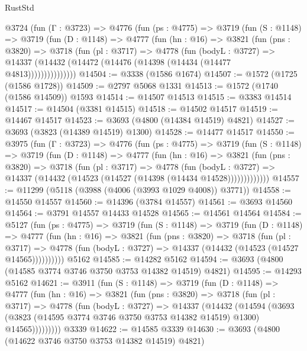 \begin{lexlean}{RustStd}
\begin{coremodule}
    @3724
      (fun (Γ : @3723) =>
      @4776
        (fun (ps : @4775) =>
        @3719
          (fun (S : @1148) =>
          @3719
            (fun (D : @1148) =>
            @4777
              (fun (hn : @16) =>
              @3821
                (fun (pns : @3820) =>
                @3718
                  (fun (pl : @3717) =>
                  @4778
                    (fun (bodyL : @3727) =>
                    @14337 (@14432 (@14472 (@14476 (@14398 (@14434 (@14477 @4813)))))))))))))))
@14504 := @3338 (@1586 @1674)
@14507 := @1572 (@1725 (@1586 @1728))
@14509 := @2797 @5068 @1331
@14513 := @1572 (@1740 (@1586 @14509)) @1593
@14514 := @14507 @14513
@14515 := @3383 @14514
@14517 := @14504 (@3381 @14515)
@14518 := @14502 @14517
@14519 := @14467 @14517
@14523 := @3693 (@4800 (@14384 @14519) @4821)
@14527 := @3693 (@3823 (@14389 @14519) @1300)
@14528 := @14477 @14517
@14550 := @3975
    (fun (Γ : @3723) =>
    @4776
      (fun (ps : @4775) =>
      @3719
        (fun (S : @1148) =>
        @3719
          (fun (D : @1148) =>
          @4777
            (fun (hn : @16) =>
            @3821
              (fun (pns : @3820) =>
              @3718
                (fun (pl : @3717) =>
                @4778
                  (fun (bodyL : @3727) =>
                  @14337 (@14432 (@14523 (@14527 (@14398 (@14434 @14528)))))))))))))
@14557 := @11299 (@5118 (@3988 (@4006 (@3993 @1029 @4008)) @3771))
@14558 := @14550 @14557
@14560 := @14396 (@3784 @14557)
@14561 := @3693 @14560
@14564 := @3791 @14557 @14433 @14528
@14565 := @14561 @14564
@14584 := @5127
    (fun (ps : @4775) =>
    @3719
      (fun (S : @1148) =>
      @3719
        (fun (D : @1148) =>
        @4777
          (fun (hn : @16) =>
          @3821
            (fun (pns : @3820) =>
            @3718
              (fun (pl : @3717) =>
              @4778 (fun (bodyL : @3727) => @14337 (@14432 (@14523 (@14527 @14565))))))))))
    @5162
@14585 := @14282 @5162
@14594 := @3693 (@4800 (@14585 @3774 @3746 @3750 @3753 @14382 @14519) @4821)
@14595 := @14293 @5162
@14621 := @3911
    (fun (S : @1148) =>
    @3719
      (fun (D : @1148) =>
      @4777
        (fun (hn : @16) =>
        @3821
          (fun (pns : @3820) =>
          @3718
            (fun (pl : @3717) =>
            @4778
              (fun (bodyL : @3727) =>
              @14337
                (@14432
                  (@14594
                    (@3693
                      (@3823 (@14595 @3774 @3746 @3750 @3753 @14382 @14519) @1300)
                      @14565)))))))))
    @3339
@14622 := @14585 @3339
@14630 := @3693 (@4800 (@14622 @3746 @3750 @3753 @14382 @14519) @4821)

\end{coremodule}
\end{lexlean}
